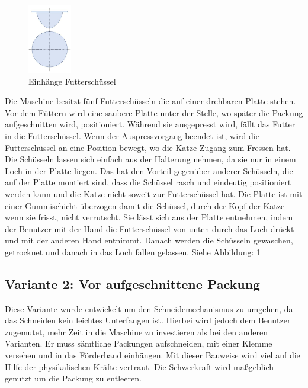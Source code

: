 \begin{figure}
\vspace{-40pt}
  \begin{center}
    \includegraphics[width=0.17\textwidth]{Bilder/Powerpoint/Loch_Futterschuessel}
  \end{center}
  \caption{Einhänge Futterschüssel}
  \label{Loch_Futterschuessel}
  \vspace{-10pt}
\end{figure}

Die Maschine besitzt fünf Futterschüsseln die auf einer drehbaren Platte stehen. Vor dem Füttern wird eine saubere Platte unter der Stelle, wo später die Packung aufgeschnitten wird, positioniert. Während sie ausgepresst wird, fällt das Futter in die Futterschüssel. Wenn der Auspressvorgang beendet ist, wird die Futterschüssel an eine Position bewegt, wo die Katze Zugang zum Fressen hat. Die Schüsseln lassen sich einfach aus der Halterung nehmen, da sie nur in einem Loch in der Platte liegen. Das hat den Vorteil gegenüber anderer Schüsseln, die auf der Platte montiert sind, dass die Schüssel rasch und eindeutig positioniert werden kann und die Katze nicht soweit zur Futterschüssel hat. Die Platte ist mit einer Gummischicht überzogen damit die Schüssel, durch der Kopf der Katze wenn sie frisst, nicht verrutscht. Sie lässt sich aus der Platte entnehmen, indem der Benutzer mit der Hand die Futterschüssel von unten durch das Loch drückt und mit der anderen Hand entnimmt. Danach werden die Schüsseln gewaschen, getrocknet und danach in das Loch fallen gelassen. Siehe Abbildung: \ref{Loch_Futterschuessel}

\subsection{Variante 2: Vor aufgeschnittene Packung }

Diese Variante wurde entwickelt um den Schneidemechanismus zu umgehen, da das Schneiden kein leichtes Unterfangen ist. Hierbei wird jedoch dem Benutzer zugemutet, mehr Zeit in die Maschine zu investieren als bei den anderen Varianten. Er muss sämtliche Packungen aufschneiden, mit einer Klemme versehen und in das Förderband einhängen. Mit dieser Bauweise wird viel auf die Hilfe der physikalischen Kräfte vertraut. Die Schwerkraft wird maßgeblich genutzt um die Packung zu entleeren.

